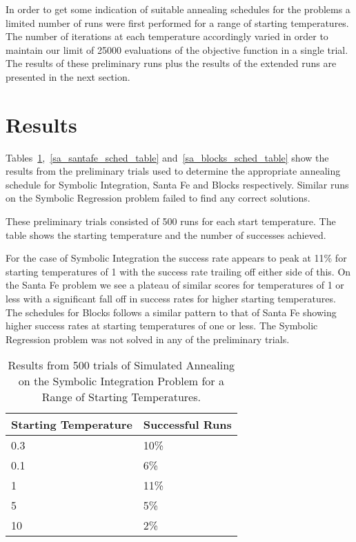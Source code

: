 In order to get some indication of suitable  annealing schedules for the problems a limited number of runs were first performed for a range of starting temperatures. The number of iterations at each temperature accordingly  varied in order to maintain our limit of 25000 evaluations of the objective function in a single trial.
The results of these preliminary runs plus the results of the extended runs are presented in the next section.



\section{Results}

Tables~\ref{sa_symint_sched_table},~\ref{sa_santafe_sched_table} and~\ref{sa_blocks_sched_table} show the results from the preliminary trials used to determine the appropriate annealing schedule for Symbolic Integration, Santa Fe and Blocks respectively. Similar runs on the Symbolic Regression problem failed to find any correct solutions. 

These preliminary trials consisted of 500 runs for each start temperature. The table shows the starting temperature and  the number of successes achieved.

For the case of Symbolic Integration the success rate appears to peak at 11\% for starting temperatures of 1 with the success rate trailing off either side of this. On the Santa Fe problem we see a plateau of similar scores for temperatures of 1 or less with a significant fall off in success rates for higher starting temperatures. The schedules for Blocks follows a  similar pattern to that of Santa Fe showing higher success rates at starting temperatures of one or less. The Symbolic Regression problem was not solved in any of the preliminary trials.


  
\begin{table}[h]
\begin{center}
\begin{tabular}{|l|l|}
\hline
Starting Temperature & Successful Runs \\
\hline
0.3 & 10\% \\
0.1 & 6\% \\
1   &  11\% \\
5   &  5\% \\
10  & 2\% \\
\hline
\end{tabular}
\caption{\label{sa_symint_sched_table} Results from 500 trials of Simulated Annealing on the Symbolic Integration Problem for a Range of Starting Temperatures.}
\end{center}
\end{table}



